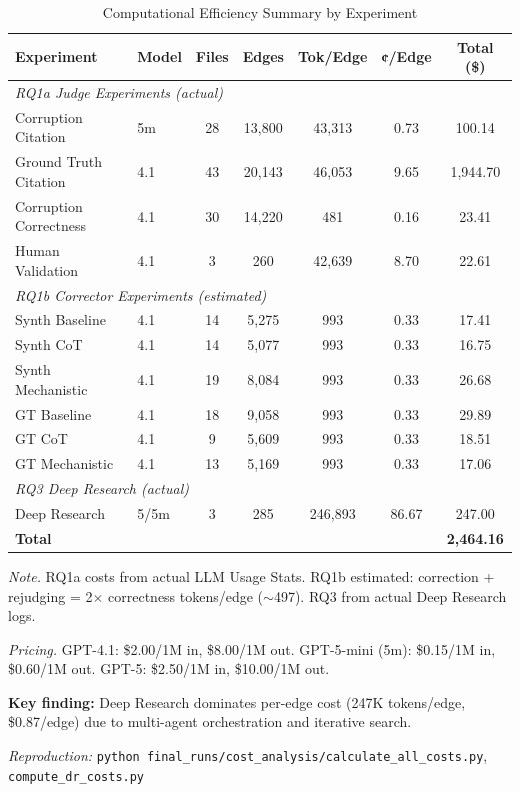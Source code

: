 \begin{table}[H]
\centering
\caption{Computational Efficiency Summary by Experiment}
\label{tab:scaling_summary}
\footnotesize
\begin{tabular}{llccccc}
\toprule
\textbf{Experiment} & \textbf{Model} & \textbf{Files} & \textbf{Edges} & \textbf{Tok/Edge} & \textbf{¢/Edge} & \textbf{Total (\$)} \\
\midrule
\multicolumn{7}{l}{\textit{RQ1a Judge Experiments (actual)}} \\
Corruption Citation & 5m & 28 & 13,800 & 43,313 & 0.73 & 100.14 \\
Ground Truth Citation & 4.1 & 43 & 20,143 & 46,053 & 9.65 & 1,944.70 \\
Corruption Correctness & 4.1 & 30 & 14,220 & 481 & 0.16 & 23.41 \\
Human Validation & 4.1 & 3 & 260 & 42,639 & 8.70 & 22.61 \\
\midrule
\multicolumn{7}{l}{\textit{RQ1b Corrector Experiments (estimated)}} \\
Synth Baseline & 4.1 & 14 & 5,275 & 993 & 0.33 & 17.41 \\
Synth CoT & 4.1 & 14 & 5,077 & 993 & 0.33 & 16.75 \\
Synth Mechanistic & 4.1 & 19 & 8,084 & 993 & 0.33 & 26.68 \\
GT Baseline & 4.1 & 18 & 9,058 & 993 & 0.33 & 29.89 \\
GT CoT & 4.1 & 9 & 5,609 & 993 & 0.33 & 18.51 \\
GT Mechanistic & 4.1 & 13 & 5,169 & 993 & 0.33 & 17.06 \\
\midrule
\multicolumn{7}{l}{\textit{RQ3 Deep Research (actual)}} \\
Deep Research & 5/5m & 3 & 285 & 246,893 & 86.67 & 247.00 \\
\midrule
\textbf{Total} & & & & & & \textbf{2,464.16} \\
\bottomrule
\end{tabular}
\begin{tablenotes}
\small
\item \textit{Note.} RQ1a costs from actual LLM Usage Stats. RQ1b estimated: correction + rejudging = 2$\times$ correctness tokens/edge ($\sim$497). RQ3 from actual Deep Research logs.
\item \textit{Pricing.} GPT-4.1: \$2.00/1M in, \$8.00/1M out. GPT-5-mini (5m): \$0.15/1M in, \$0.60/1M out. GPT-5: \$2.50/1M in, \$10.00/1M out.
\item \textbf{Key finding:} Deep Research dominates per-edge cost (247K tokens/edge, \$0.87/edge) due to multi-agent orchestration and iterative search.
\item \textit{Reproduction:} \texttt{python final\_runs/cost\_analysis/calculate\_all\_costs.py}, \texttt{compute\_dr\_costs.py}
\end{tablenotes}
\end{table}

